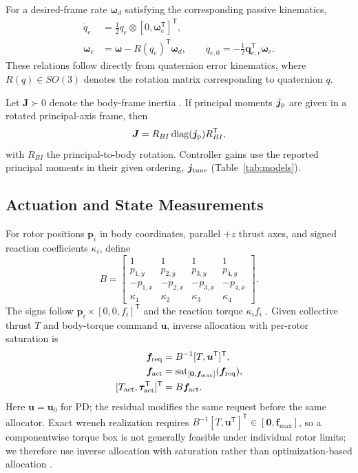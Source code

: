 \documentclass[letterpaper, 10 pt, conference]{ieeeconf}
\newcommand{\T}{^{\mathsf T}}
\newcommand{\sat}{\operatorname{sat}}
\begin{document}
For a desired-frame rate $\bm\omega_d$ satisfying the corresponding passive kinematics,
\begin{align}
 \dot q_e&=\tfrac12q_e\otimes[0,\bm\omega_e\T]\T,\\
 \bm\omega_e&=\bm\omega-R(q_e)\T\bm\omega_d,\qquad
 \dot q_{e,0}=-\tfrac12\bm q_{e,v}\T\bm\omega_e.
 \label{eq:errkin}
\end{align}
These relations follow directly from quaternion error kinematics, where $R(q)\in SO(3)$ denotes the rotation matrix corresponding to quaternion $q$.

Let $\bm J\succ0$ denote the body-frame inertia \cite{schaub2018amss}. If principal moments $\bm j_{\rm p}$ are given in a rotated principal-axis frame, then
\begin{equation}
 \bm J=R_{BI}\operatorname{diag}(\bm j_{\rm p})R_{BI}\T,
 \label{eq:inertiaframe}
\end{equation}
with $R_{BI}$ the principal-to-body rotation. Controller gains use the reported principal moments in their given ordering, $\bm j_{\rm tune}$ (Table~\ref{tab:models}).

\subsection{Actuation and State Measurements}
%
For rotor positions $\bm p_i$ in body coordinates, parallel $+z$ thrust
axes, and signed reaction coefficients $\kappa_i$, define
\begin{equation}
 B=\begin{bmatrix}
 1&1&1&1\\p_{1,y}&p_{2,y}&p_{3,y}&p_{4,y}\\
 -p_{1,x}&-p_{2,x}&-p_{3,x}&-p_{4,x}\\
 \kappa_1&\kappa_2&\kappa_3&\kappa_4
 \end{bmatrix}.
 \label{eq:allocationmatrix}
\end{equation}
The signs follow $\bm p_i\times[0,0,f_i]\T$ and the reaction torque $\kappa_i f_i$ \cite{garciacarrillo2013quad}. Given collective thrust $T$ and body-torque command $\bm u$, inverse allocation with per-rotor saturation is
\begin{equation}
 \begin{aligned}
 \bm f_{\rm req}&=B^{-1}[T,\bm u\T]\T,\\
 \bm f_{\rm act}&=\sat_{[\bm0,\bm f_{\max}]}(\bm f_{\rm req}),\\
 [T_{\rm act},\bm\tau_{\rm act}\T]\T&=B\bm f_{\rm act}.
 \end{aligned}
 \label{eq:mixer}
\end{equation}
Here $\bm u=\bm u_0$ for PD; the residual modifies the same request before the same allocator. Exact wrench realization requires $B^{-1}[T,\bm u\T]\T\in[\bm0,\bm f_{\max}]$, so a componentwise torque box is not generally feasible under individual rotor limits; we therefore use inverse allocation with saturation rather than optimization-based allocation \cite{monteiro2016allocation}.
\end{document}
